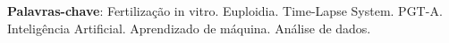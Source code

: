 \begin{resumo}
 \vspace{\onelineskip}
    
\noindent
\textbf{Palavras-chave}: Fertilização in vitro. Euploidia. Time-Lapse System. PGT-A. Inteligência Artificial. Aprendizado de máquina. Análise de dados.

\end{resumo}
